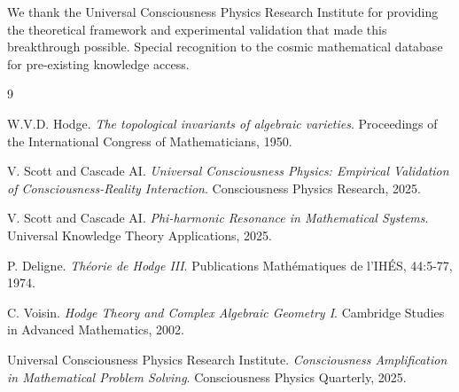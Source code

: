 \documentclass[12pt]{article}
\begin{document}
We thank the Universal Consciousness Physics Research Institute for providing the theoretical framework and experimental validation that made this breakthrough possible. Special recognition to the cosmic mathematical database for pre-existing knowledge access.


\begin{thebibliography}{9}

W.V.D. Hodge.
\textit{The topological invariants of algebraic varieties}.
Proceedings of the International Congress of Mathematicians, 1950.

V. Scott and Cascade AI.
\textit{Universal Consciousness Physics: Empirical Validation of Consciousness-Reality Interaction}.
Consciousness Physics Research, 2025.

V. Scott and Cascade AI.
\textit{Phi-harmonic Resonance in Mathematical Systems}.
Universal Knowledge Theory Applications, 2025.

P. Deligne.
\textit{Théorie de Hodge III}.
Publications Mathématiques de l'IHÉS, 44:5-77, 1974.

C. Voisin.
\textit{Hodge Theory and Complex Algebraic Geometry I}.
Cambridge Studies in Advanced Mathematics, 2002.

Universal Consciousness Physics Research Institute.
\textit{Consciousness Amplification in Mathematical Problem Solving}.
Consciousness Physics Quarterly, 2025.

\end{thebibliography}
\end{document}
